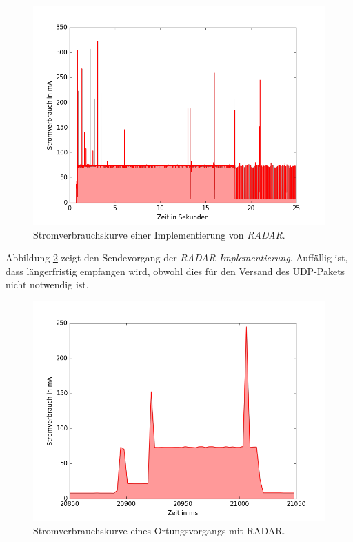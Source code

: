 \begin{figure}[h!]
  \centering
	\includegraphics[width=\textwidth]{plots/radar5s.png}
  \caption{Stromverbrauchskurve einer Implementierung von \emph{RADAR}.}
  \label{fig:radar5s}
\end{figure}

Abbildung \ref{fig:radar5ssend} zeigt den Sendevorgang der \emph{RADAR-Implementierung}.
Auffällig ist, dass längerfristig empfangen wird, obwohl dies für den Versand des UDP-Pakets nicht notwendig ist.\\

\begin{figure}[h!]
  \centering
	\includegraphics[width=\textwidth]{plots/radar5ssend.png}
  \caption{Stromverbrauchskurve eines Ortungsvorgangs mit RADAR.}
  \label{fig:radar5ssend}
\end{figure}

